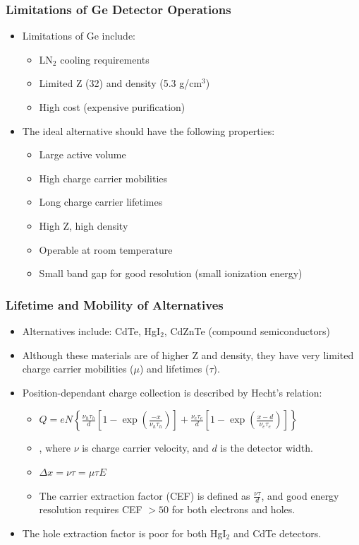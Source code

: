 \subsubsection{Limitations of Ge Detector Operations}
\begin{itemize}
    \item Limitations of Ge include:
    \begin{itemize}
        \item LN$_2$ cooling requirements
        \item Limited Z (32) and density (5.3 g/cm$^3$)
        \item High cost (expensive purification) 
    \end{itemize}
    \item The ideal alternative should have the following properties:
    \begin{itemize}
        \item Large active volume
        \item High charge carrier mobilities
        \item Long charge carrier lifetimes
        \item High Z, high density
        \item Operable at room temperature
        \item Small band gap for good resolution (small ionization energy)
    \end{itemize}
\end{itemize}

\subsubsection{Lifetime and Mobility of Alternatives}
\begin{itemize}
    \item Alternatives include: CdTe, HgI$_2$, CdZnTe (compound semiconductors)
    \item Although these materials are of higher Z and density, they have very limited charge carrier mobilities ($\mu$) and lifetimes ($\tau$).
    \item Position-dependant charge collection is described by Hecht's relation:
    \begin{itemize}
        \item[] $Q=eN\left\{\frac{\nu_h\tau_h}{d}\left[1-\exp\left(\frac{-x}{\nu_h\tau_h}\right)\right]+\frac{\nu_e\tau_e}{d}\left[1-\exp\left(\frac{x-d}{\nu_e\tau_e}\right)\right]\right\}$
        \item[] , where $\nu$ is charge carrier velocity, and $d$ is the detector width.
        \item[] $\Delta x=\nu\tau=\mu\tau E$
        \item[] The carrier extraction factor (CEF) is defined as $\frac{\nu\tau}{d}$, and good energy resolution requires CEF $>50$ for both electrons and holes.
    \end{itemize}
    \item The hole extraction factor is poor for both HgI$_2$ and CdTe detectors.
\end{itemize}
